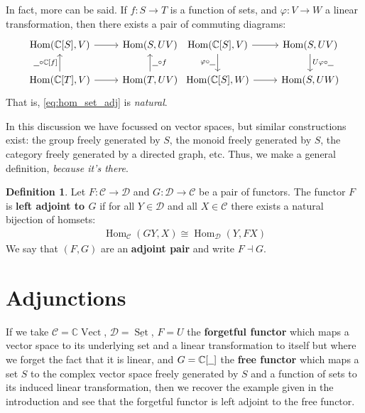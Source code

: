\documentclass[12pt]{article}
\theoremstyle{plain}
\theoremstyle{definition}
\newtheorem{defn}[thm]{Definition} %
\newcommand{\bb}[1]{\mathbb{#1}}
\newcommand{\scr}[1]{\mathscr{#1}}
\newcommand{\und}[1]{\underline{\hspace{#1 cm}}}
\newcommand{\lto}{\longrightarrow}
\begin{document}
In fact, more can be said. If $f: S \lto T$ is a function of sets, and $\varphi: V \lto W$ a linear transformation, then there exists a pair of commuting diagrams:
\begin{equation}
	\begin{tikzcd}
		\operatorname{Hom}(\bb{C}[S], V)\arrow[r] & \operatorname{Hom}(S, UV)\\
		\operatorname{Hom}(\bb{C}[T], V)\arrow[r]\arrow[u,"{\und{0.2} \circ \bb{C}[f]}"] & \operatorname{Hom}(T, UV)\arrow[u,swap,"{\und{0.2} \circ f}"]
		\end{tikzcd}
	\begin{tikzcd}
		\operatorname{Hom}(\bb{C}[S], V)\arrow[r]\arrow[d,swap,"{\varphi \circ \und{0.2}}"] & \operatorname{Hom}(S, UV)\arrow[d,"{U\varphi \circ \und{0.2}}"]\\
		\operatorname{Hom}(\bb{C}[S], W)\arrow[r] & \operatorname{Hom}(S, UW)
	\end{tikzcd}
	\end{equation}
That is, \eqref{eq:hom_set_adj} is \emph{natural}.

In this discussion we have focussed on vector spaces, but similar constructions exist: the group freely generated by $S$, the monoid freely generated by $S$, the category freely generated by a directed graph, etc. Thus, we make a general definition, \emph{because it's there}.

\begin{defn}
	Let $F: \scr{C} \lto \scr{D}$ and $G: \scr{D} \lto \scr{C}$ be a pair of functors. The functor $F$ is \textbf{left adjoint to $G$} if for all $Y \in \scr{D}$ and all $X \in \scr{C}$ there exists a natural bijection of homsets:
	\begin{align*}
		\operatorname{Hom}_{\scr{C}}(GY, X) \cong \operatorname{Hom}_{\scr{D}}(Y, FX)
		\end{align*}
	We say that $(F,G)$ are an \textbf{adjoint pair} and write $F \dashv G$.
	\end{defn}

\section{Adjunctions}
If we take $\scr{C} = \bb{C}\operatorname{Vect}$, $\scr{D} = \underline{\operatorname{Set}}$, $F = U$ the \textbf{forgetful functor} which maps a vector space to its underlying set and a linear transformation to itself but where we forget the fact that it is linear, and $G = \bb{C}[\und{0.2}]$ the \textbf{free functor} which maps a set $S$ to the complex vector space freely generated by $S$ and a function of sets to its induced linear transformation, then we recover the example given in the introduction and see that the forgetful functor is left adjoint to the free functor.
\end{document}
